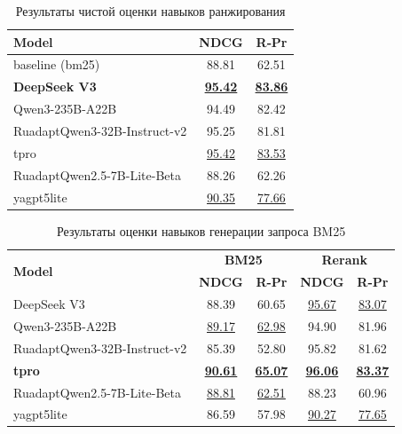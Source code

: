 \documentclass{article}
\begin{document}
\begin{table}[ht!]
\centering
\caption{Результаты чистой оценки навыков ранжирования}
\begin{tabular}{l|c|c}
\hline
\textbf{Model} & \textbf{NDCG} & \textbf{R‑Pr} \\
\hline
baseline (bm25)                                                  & 88.81 & 62.51 \\
\hline
\textbf{DeepSeek V3}                                             & \uline{\textbf{95.42}} & \uline{\textbf{83.86}} \\
Qwen3-\allowbreak 235B-\allowbreak A22B                          & 94.49 & 82.42 \\
\hline
RuadaptQwen3-\allowbreak 32B-\allowbreak Instruct-\allowbreak v2 & 95.25 & 81.81 \\
tpro                                                             & \uline{95.42} & \uline{83.53} \\
\hline
RuadaptQwen2.5-7B-\allowbreak Lite-\allowbreak Beta              & 88.26 & 62.26 \\
yagpt5lite                                                       & \uline{90.35} & \uline{77.66} \\
\hline
\end{tabular}
\label{tab:query_ref}
\end{table}

\begin{table}[ht]
\centering
\caption{Результаты оценки навыков генерации запроса BM25}
\begin{tabular}{l|cc|cc}
\hline
\multirow{2}{*}{\textbf{Model}} & \multicolumn{2}{c|}{\textbf{BM25}} & \multicolumn{2}{c}{\textbf{Rerank}} \\
 & \textbf{NDCG} & \textbf{R-Pr} & \textbf{NDCG} & \textbf{R-Pr} \\
\hline
DeepSeek V3                                                      & 88.39 & 60.65 & \uline{95.67} & \uline{83.07} \\
Qwen3-235B-A22B                                                  & \uline{89.17} & \uline{62.98} & 94.90 & 81.96 \\
\hline
RuadaptQwen3-\allowbreak 32B-\allowbreak Instruct-\allowbreak v2 & 85.39 & 52.80 & 95.82 & 81.62 \\
\textbf{tpro}                                                    & \uline{\textbf{90.61}} & \uline{\textbf{65.07}} & \uline{\textbf{96.06}} & \uline{\textbf{83.37}} \\
\hline
RuadaptQwen2.5-7B-\allowbreak Lite-\allowbreak Beta              & \uline{88.81} & \uline{62.51} & 88.23 & 60.96 \\
yagpt5lite                                                       & 86.59 & 57.98 & \uline{90.27} & \uline{77.65} \\
\hline
\end{tabular}
\label{tab:query_def}
\end{table}
\end{document}

